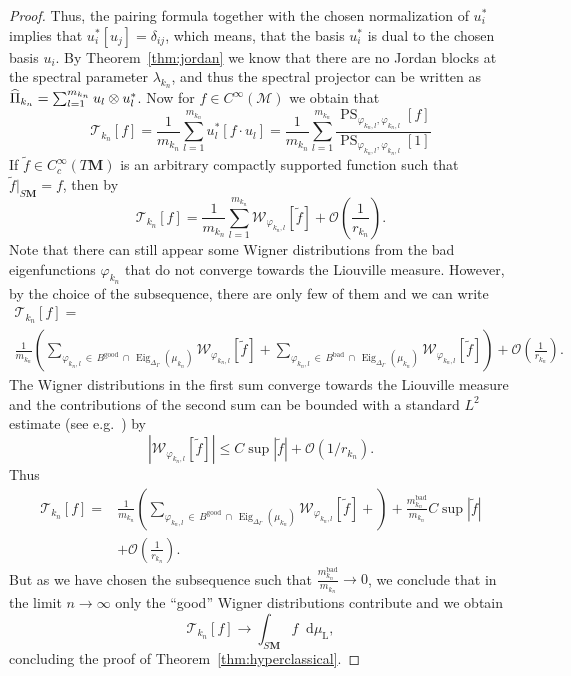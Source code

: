 \documentclass[10pt]{amsart}
\theoremstyle{definition}
\DeclareMathOperator{\Eig}{Eig}
\DeclareMathOperator{\good}{good}
\DeclareMathOperator{\bad}{bad}
\newcommand{\rml}{\mathrm{L}}
\newcommand{\bfm}{\mathbf{M}}
\newcommand{\la}{\lambda}
\newcommand{\til}{\widetilde}
\newcommand{\intd}{\mathop{}\!\mathrm{d}}
\renewcommand*{\hat}[1]{\mathchoice{\widehat{#1}}{\widehat{#1}}{\oldhat{#1}}{\oldhat{#1}}}\let\oldexists\exists
\renewcommand*{\exists}{\mathrel{\oldexists}}
\begin{document}
\begin{proof}
Thus, the pairing formula together with the chosen normalization of $u_i^*$ implies that $u_i^*[u_j]=\delta_{ij}$, which means, that the basis $u_i^*$ is dual to the chosen basis $u_i$. By Theorem~\ref{thm:jordan} we know that there are no Jordan blocks at the spectral parameter $\la_{k_n}$, and thus the spectral projector can be written as $\hat \Pi_{k_n} = \sum_{l=1}^{m_{k_n}} u_l\otimes u_l^*$. Now for $f\in C^{\infty}(\mathcal M)$ we obtain that
\[
\mathcal T_{k_n}[f] = \frac{1}{m_{k_n}} \sum_{l=1}^{m_{k_n}} u_l^*[f\cdot u_l] = \frac{1}{m_{k_n}}\sum_{l=1}^{m_{k_n}} \frac{\operatorname{PS}_{\varphi_{k_n,l}, \varphi_{k_n,l}}[f]}{\operatorname{PS}_{\varphi_{k_n,l}, \varphi_{k_n,l}}[1]}
\]
If $\til f\in C_c^\infty(T\bfm)$ is an arbitrary compactly supported function such that $\til f|_{S{\bfm}}=f$, then by~\cite{HHS12}
\[
\mathcal T_{k_n}[f] =\frac{1}{m_{k_n}} \sum_{l=1}^{m_{k_n}} \mathcal W_{\varphi_{k_n,l}}[\til f] + \mathcal O\left(\frac{1}{r_{k_n}}\right).
\]
Note that there can still appear some Wigner distributions from the bad eigenfunctions $\varphi_{k_n}$ that do not converge towards the Liouville measure. However, by the choice of the subsequence, there are only few of them and we can write
\begin{multline*}
\mathcal T_{k_n}[f] =\\
\frac{1}{m_{k_n}}\left(\sum_{\varphi_{k_n, l}\,\in\, B^{\good}\,\cap\,\Eig_{\Delta_\Gamma}(\mu_{k_n})} \mathcal W_{\varphi_{k_n,l}}[\til f] +\!\! \sum_{\varphi_{k_n, l}\,\in\,B^{\bad}\,\cap\, \Eig_{\Delta_\Gamma}(\mu_{k_n})} \mathcal W_{\varphi_{k_n,l}}[\til f] \right) + \mathcal O\left(\frac{1}{r_{k_n}}\right).
\end{multline*}
The Wigner distributions in the first sum converge towards the Liouville measure and the contributions of the second sum can be bounded with a standard $L^2$ estimate (see e.g.~\cite[Theorem~5.1]{Zw12}) by
\[
|\mathcal W_{\varphi_{k_n,l}}[\til f]|\leq C\sup|\til f| + \mathcal O(1/r_{k_n}).
\]
Thus
\begin{align*}
\mathcal T_{k_n}[f] =&\frac{1}{m_{k_n}}\left(\sum_{\varphi_{k_n, l}\,\in\,B^{\good}\,\cap\, \Eig_{\Delta_\Gamma}(\mu_{k_n})} \mathcal W_{\varphi_{k_n,l}}[\til f] + \right) + \frac{m_{k_n}^{\bad}}{m_{k_n}}C\sup|\til f|\\
&+ \mathcal O\left(\frac{1}{r_{k_n}}\right).
\end{align*}
But as we have chosen the subsequence such that $\frac{m_{k_n}^{\bad}}{m_{k_n}} \to 0$, we conclude that in the limit $n\to\infty$ only the ``good'' Wigner distributions contribute and we obtain
\[
\mathcal T_{k_n}[f] \to \int_{S\mathbf M} f \intd \mu_{\rml},
\]
concluding the proof of Theorem~\ref{thm:hyperclassical}.
\end{proof}
\end{document}
